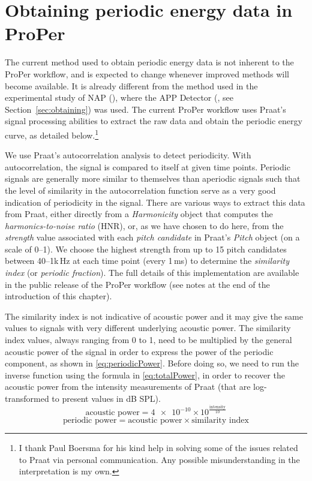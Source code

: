 \section{Obtaining periodic energy data in ProPer}\label{sec:obtainingProPer}

The current method used to obtain periodic energy data is not inherent to the ProPer workflow, and is expected to change whenever improved methods will become available. It is already different from the method used in the experimental study of NAP (), where the APP Detector (\citealt{deshmukh2005use}, see Section~\ref{sec:obtaining}) was used. The current ProPer workflow uses Praat's signal processing abilities to extract the raw data and obtain the periodic energy curve, as detailed below.\footnote{I thank Paul Boersma for his kind help in solving some of the issues related to Praat via personal communication. Any possible misunderstanding in the interpretation is my own.}

We use Praat's autocorrelation analysis to detect periodicity. With autocorrelation, the signal is compared to itself at given time points. Periodic signals are generally more similar to themselves than aperiodic signals such that the level of similarity in the autocorrelation function serve as a very good indication of periodicity in the signal. There are various ways to extract this data from Praat, either directly from a \emph{Harmonicity} object that computes the \emph{harmonics-to-noise ratio} (HNR), or, as we have chosen to do here, from the \emph{strength} value associated with each \emph{pitch candidate} in Praat's \emph{Pitch} object (on a scale of 0--1). We choose the highest strength from up to 15 pitch candidates between 40--1k\,Hz at each time point (every 1\,ms) to determine the \emph{similarity index} (or \emph{periodic fraction}). The full details of this implementation are available in the public release of the ProPer workflow (see notes at the end of the introduction of this chapter).

The similarity index is not indicative of acoustic power and it may give the same values to signals with very different underlying acoustic power. The similarity index values, always ranging from 0 to 1, need to be multiplied by the general acoustic power of the signal in order to express the power of the periodic component, as shown in \eqref{eq:periodicPower}. Before doing so, we need to run the inverse function using the formula in \eqref{eq:totalPower}, in order to recover the acoustic power from the intensity measurements of Praat (that are log-transformed to present values in dB SPL).
\begin{equation}
  \text{acoustic power} = \num{4e-10} \times  10^{\frac{\text{intensity}}{10}}    \label{eq:totalPower}
\end{equation}
\begin{equation}
  \text{periodic power} = \text{acoustic power} \times \text{similarity index}    \label{eq:periodicPower}
\end{equation}

